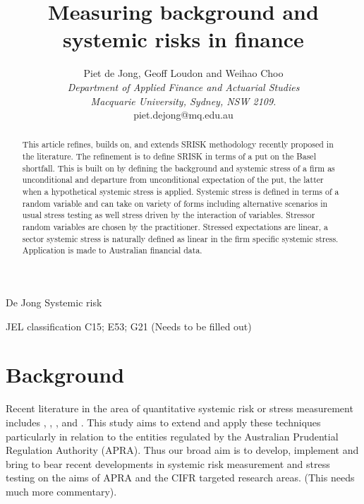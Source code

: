 \documentclass[authoryear]{elsarticle}
\begin{document}
\title{Measuring background and systemic risks in finance}
\author{Piet de Jong,  Geoff Loudon and Weihao Choo \\[4pt]
\textit{Department of Applied Finance and Actuarial Studies\\ Macquarie University, Sydney, NSW 2109.}
\\[2pt]
{piet.dejong@mq.edu.au}}

\markboth%
{De Jong}
{Systemic risk}

\begin{abstract}
This article refines, builds on, and extends  SRISK methodology recently proposed in the literature.  The refinement is to define SRISK in terms of a put on the Basel shortfall.   This  is built on by defining the background and systemic stress  of a firm as unconditional and departure from unconditional  expectation of the put, the latter when a hypothetical systemic stress is applied.  Systemic stress is defined in terms of a random variable and can take on variety of forms including alternative scenarios in usual stress testing as well stress driven by the interaction of variables.  Stressor random variables  are chosen by the practitioner.  Stressed expectations are linear, a sector systemic stress is naturally defined as linear in the firm specific systemic stress.      Application is made to Australian financial data.
\end{abstract}

\maketitle

JEL classification
C15; E53; G21  (Needs to be filled out)

\section{Background}

Recent literature in the area of quantitative systemic risk or stress measurement includes
\cite{adrian2011covar},
\cite{acharya2012capital},
\cite{acharya2012measuring},
 \cite{brownlees2010volatility} and \cite{brownlees2015}.   This study aims to extend and apply these techniques particularly in relation to the entities regulated by the Australian Prudential Regulation Authority (APRA). Thus our  broad aim is to develop, implement and bring to bear recent developments in systemic risk measurement and stress testing  on the aims of APRA and the CIFR targeted research areas.   (This needs much more commentary).
\end{document}
